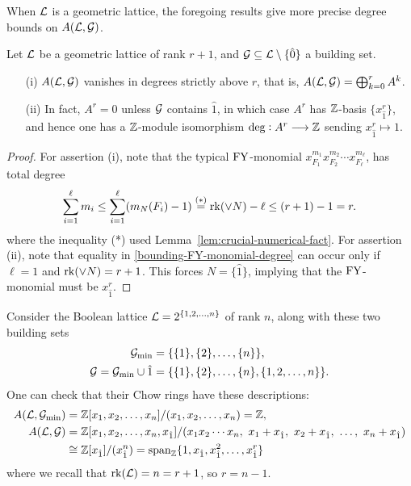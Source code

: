 When $\mathcal{L}$ is a geometric lattice, the foregoing results
give more precise degree bounds on $A(\mathcal{L},\mathcal{G})$. 

\begin{cor}
\label{Chow-ring-degrees}
Let $\mathcal{L}$ be a geometric lattice of rank $r+1$, and $\mathcal{G} \subseteq \mathcal{L} \setminus \{\hat{0}\}$ a building set.
\begin{itemize}
\item[(i)] $A(\mathcal{L}, \mathcal{G})$ vanishes in degrees strictly above $r$,
that is, $A(\mathcal{L}, \mathcal{G})=\bigoplus_{k=0}^r A^k$.
\item[(ii)] In fact, $A^r=0$ unless $\mathcal{G}$ contains $\hat{1}$, in which case $A^r$ has $\mathbb{Z}$-basis $\{x_{\hat{1}}^r\}$, and hence one has a $\mathbb{Z}$-module isomorphism
$\deg: A^r \longrightarrow \mathbb{Z}$ sending $x_{\hat{1}}^r \longmapsto 1$.
\end{itemize}
\end{cor}
\begin{proof}
For assertion (i), note that the typical $\mathrm{FY}$-monomial $x_{F_1}^{m_1} x_{F_2}^{m_2} \cdots x_{F_\ell}^{m_\ell}$,
has total degree
\begin{equation}
\label{bounding-FY-monomial-degree}
\sum_{i=1}^\ell m_i
\leq \sum_{i=1}^\ell (m_N(F_i) - 1)
\overset{(*)}{=} \operatorname{\mathrm{rk}}(\vee N) - \ell
\leq (r+1) - 1 = r.
\end{equation}
where the inequality (*) used Lemma~\ref{lem:crucial-numerical-fact}.
For assertion (ii), note that
equality in \eqref{bounding-FY-monomial-degree} can occur only if $\ell=1$ and $\operatorname{\mathrm{rk}}(\vee N)=r+1$. This 
forces $N=\{\hat{1}\}$, implying that the $\mathrm{FY}$-monomial must be $x_{\hat{1}}^r$.
\end{proof}


\begin{example}
Consider the Boolean lattice $\mathcal{L}=2^{\{1,2,\ldots,n\}}$ of rank $n$, along with these two building sets \begin{align*}
    \mathcal{G}_{\min}&=\{ \{1\},\{2\}, \ldots, \{n\} \},\\
    \mathcal{G}=\mathcal{G}_{\min} \cup \hat{1} &=\{ \{1\},\{2\}, \ldots, \{n\}, \{1,2,\ldots,n\} \}.
\end{align*}
One can check that their Chow rings have these descriptions:
\begin{align*}
    A(\mathcal{L},\mathcal{G}_{\min})&=\mathbb{Z}[x_1,x_2,\ldots,x_n]/(x_1,x_2,\ldots,x_n)=\mathbb{Z},\\
    A(\mathcal{L},\mathcal{G})&=\mathbb{Z}[x_1,x_2,\ldots,x_n,x_{\hat{1}}]
      /(x_1 x_2 \cdots x_n, \,\, x_1+x_{\hat{1}},\,\,
      x_2+x_{\hat{1}},\,\,\ldots,\,\, x_n+x_{\hat{1}})\\
      &\cong \mathbb{Z}[x_{\hat{1}}]/(x_{\hat{1}}^n)
      =\mathrm{span}_{\mathbb{Z}}\{1,x_{\hat{1}},x_{\hat{1}}^2,
      \ldots,x_{\hat{1}}^r\}
\end{align*}
where we recall that $\operatorname{\mathrm{rk}}(\mathcal{L})=n=r+1$, so $r=n-1$.
\end{example}


